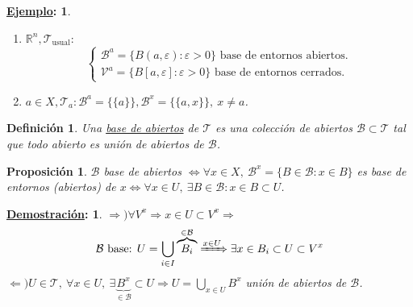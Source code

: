 \documentclass[10pt,a4paper,openright]{book}
\theoremstyle{break}
\newtheorem*{defi}{Definición}
\newtheorem*{prop}{Proposición}
\newtheorem*{demo}{\underline{Demostración}:}
\newtheorem*{ej}{\underline{Ejemplo}:}
\begin{document}
\begin{ej}
\begin{enumerate}
    \item $\mathbb{R}^n, \mathcal{T}_{\text{usual}}: $
    \[
    \begin{cases}
    \mathcal{B}^a = \{B\left( a, \varepsilon \right): \varepsilon > 0\} \text{ base de entornos abiertos.}  \\
    \mathcal{V}^a = \{B\left[ a, \varepsilon \right]: \varepsilon > 0\} \text{ base de entornos cerrados.} 
    \end{cases} 
    \]
    \item $a \in X, \mathcal{T}_a : \mathcal{B}^a = \{\{a\}\}, \mathcal{B}^x = \{\{a, x\}\},\ x \neq a$.
\end{enumerate}
\end{ej}

\begin{defi}
Una \underline{base de abiertos} de $\mathcal{T}$ es una colección de abiertos $\mathcal{B} \subset \mathcal{T}$ tal que todo abierto es unión de abiertos de $\mathcal{B}$.
\end{defi}

\begin{prop}
$\mathcal{B}$ base de abiertos $\Leftrightarrow \forall x \in X,\ \mathcal{B}^x = \{B \in \mathcal{B} : x \in B\}$ es base de entornos (abiertos) de $x \Leftrightarrow \forall x \in U,\ \exists B \in \mathcal{B} : x \in B \subset U$.
\end{prop}
\begin{demo}
$\Rightarrow) \forall V^x \Rightarrow x \in U \subset V^x \Rightarrow$
\[
    \mathcal{B} \text{ base: } U = \bigcup_{i \in  I} \overbrace{B_i}^{\in \mathcal{B}} \xRightarrow{x \in U} \exists x \in B_i \subset U \subset V^x
\]
$\Leftarrow) U \in \mathcal{T},\ \forall x \in U,\ \exists \underbrace{B^x}_{\in \mathcal{B}} \subset U \Rightarrow U = \bigcup_{x \in U} B^x$ unión de abiertos de $\mathcal{B}$.
\end{demo}
\end{document}
